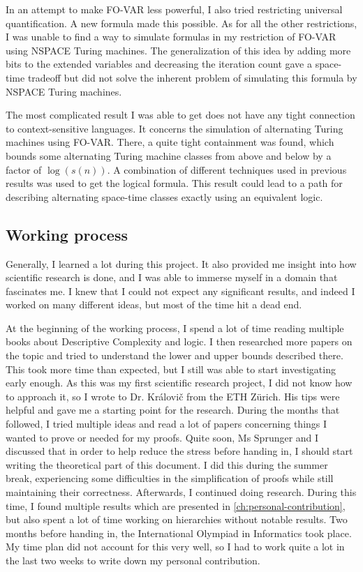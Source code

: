 In an attempt to make FO-VAR less powerful, I also tried restricting universal quantification.
A new formula made this possible.
As for all the other restrictions, I was unable to find a way to simulate formulas in my restriction of FO-VAR using NSPACE Turing machines.
The generalization of this idea by adding more bits to the extended variables and decreasing the iteration count gave a space-time tradeoff but did not solve the inherent problem of simulating this formula by NSPACE Turing machines.

The most complicated result I was able to get does not have any tight connection to context-sensitive languages.
It concerns the simulation of alternating Turing machines using FO-VAR\@.
There, a quite tight containment was found, which bounds some alternating Turing machine classes from above and below by a factor of $\log(s(n))$.
A combination of different techniques used in previous results was used to get the logical formula.
This result could lead to a path for describing alternating space-time classes exactly using an equivalent logic.

\subsection{Working process}\label{subsec:working-process}
Generally, I learned a lot during this project.
It also provided me insight into how scientific research is done, and I was able to immerse myself in a domain that fascinates me.
I knew that I could not expect any significant results, and indeed I worked on many different ideas, but most of the time hit a dead end.

At the beginning of the working process, I spend a lot of time reading multiple books about Descriptive Complexity and logic.
I then researched more papers on the topic and tried to understand the lower and upper bounds described there.
This took more time than expected, but I still was able to start investigating early enough.
As this was my first scientific research project, I did not know how to approach it, so I wrote to Dr. Královi\v{c} from the ETH Zürich.
His tips were helpful and gave me a starting point for the research.
During the months that followed, I tried multiple ideas and read a lot of papers concerning things I wanted to prove or needed for my proofs.
Quite soon, Ms Sprunger and I discussed that in order to help reduce the stress before handing in, I should start writing the theoretical part of this document.
I did this during the summer break, experiencing some difficulties in the simplification of proofs while still maintaining their correctness.
Afterwards, I continued doing research.
During this time, I found multiple results which are presented in \cref{ch:personal-contribution}, but also spent a lot of time working on hierarchies without notable results.
Two months before handing in, the International Olympiad in Informatics took place.
My time plan did not account for this very well, so I had to work quite a lot in the last two weeks to write down my personal contribution.

